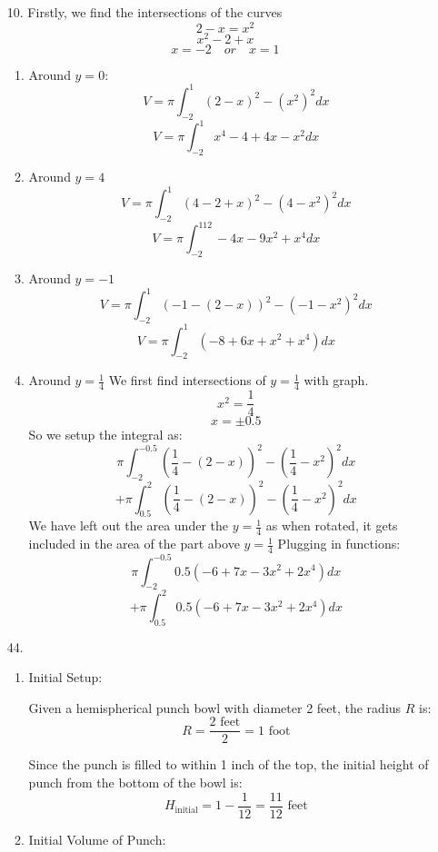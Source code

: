 \documentclass[12pt]{article}
\begin{document}
\begin{enumerate}[start=1,label={\bfseries. },leftmargin=1in]
  \item [10. ]
  Firstly, we find the intersections of the curves
  \[
  2-x = x^2
  \]
  \[
  x^2 -2 +x
  \]
  \[
  x=-2 \quad or \quad x=1
  \]
     \begin{enumerate}
       \item Around $y=0$:
       \[
       V = \pi\int_{-2}^1 (2-x)^2 - (x^2)^2dx
       \]
       \[
       V = \pi\int_{-2}^1 x^4 - 4 + 4x - x^2 dx
       \]
       \item Around $y=4$
       \[
       V = \pi\int_{-2}^1 (4 - 2 +x)^2 - (4-x^2)^2dx
       \]
       \[
       V = \pi\int_{-2}^112 - 4 x - 9 x^2 + x^4dx
       \]
       \item Around $y = -1$
       \[
       V = \pi\int_{-2}^1 (-1-(2-x))^2 - (-1-x^2)^2dx
       \]
       \[
       V = \pi\int_{-2}^1(-8 + 6 x + x^2 + x^4)dx
       \]
       \item Around $y=\frac{1}{4}$
       We first find intersections of $y=\frac{1}{4}$ with graph. 
       \[
       x^2 = \frac{1}{4}
       \]
       \[
       x = \pm 0.5
       \]
       So we setup the integral as:
       \[
       \pi\int_{-2}^{-0.5} \left(\frac{1}{4}-(2-x)\right)^2 - \left(\frac{1}{4}-x^2\right)^2 dx
       \]
       \[
       +\pi\int_{0.5}^{2} \left(\frac{1}{4}-(2-x)\right)^2 - \left(\frac{1}{4}-x^2\right)^2 dx
       \]
       We have left out the area under the $y=\frac{1}{4}$ as when rotated, it gets included in the area of the part above $y=\frac{1}{4}$
       Plugging in functions:
       \[
       \pi\int_{-2}^{-0.5}0.5 (-6 + 7 x - 3 x^2 + 2 x^4)dx
       \]
       \[
       +\pi\int_{0.5}^{2}0.5 (-6 + 7 x - 3 x^2 + 2 x^4)dx
       \]
     \end{enumerate}

    \item [44. ]
    \begin{enumerate}

        \item Initial Setup:
        
        Given a hemispherical punch bowl with diameter 2 feet, the radius \( R \) is:
        \[
        R = \frac{2 \text{ feet}}{2} = 1 \text{ foot}
        \]
        
        Since the punch is filled to within 1 inch of the top, the initial height of punch from the bottom of the bowl is:
        \[
        H_{\text{initial}} = 1 - \frac{1}{12} = \frac{11}{12} \text{ feet}
        \]
        
        \item Initial Volume of Punch:
        

\end{enumerate}
\end{enumerate}
\end{document}
